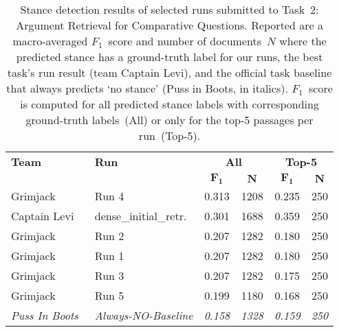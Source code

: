 \begin{table}[t]
\centering
\small
\renewcommand{\tabcolsep}{10pt}
\caption{Stance detection results of selected runs submitted to Task~2: Argument Retrieval for Comparative Questions. Reported are a macro-averaged $F_1$~score and number of documents~$N$ where the predicted stance has a ground-truth label for our runs, the best task's run result (team Captain Levi), and the official task baseline that always predicts `no stance' (Puss in Boots, in italics). $F_1$~score is computed for all predicted stance labels with corresponding ground-truth labels~(All) or only for the top-5 passages per run~(Top-5).}
\label{table-results-stance}
\begin{tabular}{@{}llcccc@{}}
\toprule
\textbf{Team} & \textbf{Run} & \multicolumn{2}{c}{\textbf{All}} & \multicolumn{2}{c}{\textbf{Top-5}} \\
& & $\bm{F_1}$ & $\bm{N}$ & $\bm{F_1}$ & $\bm{N}$ \\
\midrule
Grimjack & Run 4 & 0.313 & 1208 & 0.235 & 250 \\
Captain Levi~\cite{RanaGJCEHP2022} & dense\_initial\_retr. & 0.301 & 1688 & 0.359 & 250 \\
Grimjack & Run 2 & 0.207 & 1282 & 0.180 & 250 \\
Grimjack & Run 1 & 0.207 & 1282 & 0.180 & 250 \\
Grimjack & Run 3 & 0.207 & 1282 & 0.175 & 250 \\
Grimjack & Run 5 & 0.199 & 1180 & 0.168 & 250 \\
\textit{Puss In Boots}~\cite{BondarenkoFKSGBPBSWPH2022} & \textit{Always-NO-Baseline} & \textit{0.158} & \textit{1328} & \textit{0.159} & \textit{250} \\
\bottomrule
\end{tabular}
\end{table}

